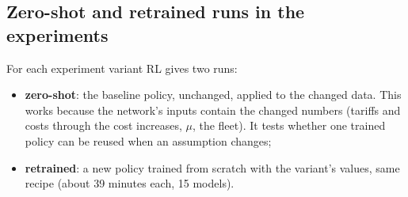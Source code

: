 \subsection{Zero-shot and retrained runs in the experiments}

For each experiment variant RL gives two runs:
\begin{itemize}
  \item \textbf{zero-shot}: the baseline policy, unchanged, applied to the changed data. This works because the network's inputs contain the changed numbers (tariffs and costs through the cost increases, $\mu$, the fleet). It tests whether one trained policy can be reused when an assumption changes;
  \item \textbf{retrained}: a new policy trained from scratch with the variant's values, same recipe (about 39 minutes each, 15 models).
\end{itemize}

